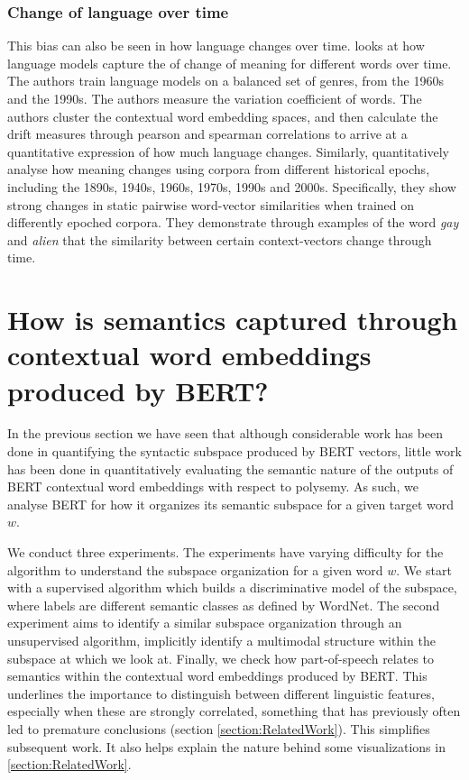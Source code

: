 \documentclass[a4paper,12pt,oneside,openright]{report}
\begin{document}
\subsection{Change of language over time}

This bias can also be seen in how language changes over time. \cite{martinc20} looks at how language models capture the of change of meaning for different words over time.
The authors train language models on a balanced set of genres, from the 1960s and the 1990s.
The authors measure the variation coefficient of words.
The authors cluster the contextual word embedding spaces, and then calculate the drift measures through pearson and spearman correlations to arrive at a quantitative expression of how much language changes.
Similarly, \cite{hu19} quantitatively analyse how meaning changes using corpora from different historical epochs, including the 1890s, 1940s, 1960s, 1970s, 1990s and 2000s. 
Specifically, they show strong changes in static pairwise word-vector similarities when trained on differently epoched corpora.
They demonstrate through examples of the word \textit{gay} and \textit{alien} that the similarity between certain context-vectors change through time.

\chapter{How is semantics captured through contextual word embeddings produced by BERT?}\label{section:Understand_BERT}\label{section:UnderstandingBERT} 

In the previous section we have seen that although considerable work has been done in quantifying the syntactic subspace produced by BERT vectors, little work has been done in quantitatively evaluating the semantic nature of the outputs of BERT contextual word embeddings with respect to polysemy.
As such, we analyse BERT for how it organizes its semantic subspace for a given target word $w$.

We conduct three experiments.
The experiments have varying difficulty for the algorithm to understand the subspace organization for a given word $w$.
We start with a supervised algorithm which builds a discriminative model of the subspace, where labels are different semantic classes as defined by WordNet.
The second experiment aims to identify a similar subspace organization through an unsupervised algorithm, implicitly identify a multimodal structure within the subspace at which we look at.
Finally, we check how part-of-speech relates to semantics within the contextual word embeddings produced by BERT. 
This underlines the importance to distinguish between different linguistic features, especially when these are strongly correlated, something that has previously often led to premature conclusions (section \ref{section:RelatedWork}). 
This simplifies subsequent work.
It also helps explain the nature behind some visualizations in \ref{section:RelatedWork}.
\end{document}
